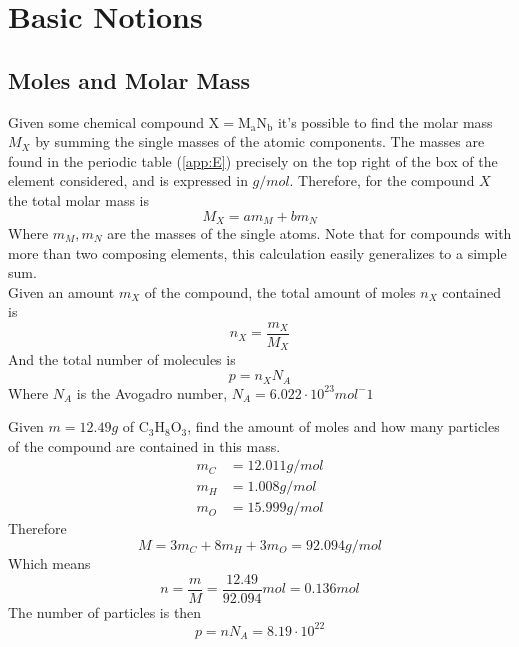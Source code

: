 \documentclass[../qm.tex]{subfiles}
\begin{document}
\section{Basic Notions}
\subsection{Moles and Molar Mass}
Given some chemical compound $\mathrm{X}=\mathrm{M_aN_b}$ it's possible to find the molar mass $M_X$ by summing the single masses of the atomic components. The masses are found in the periodic table (\ref{app:E}) precisely on the top right of the box of the element considered, and is expressed in $\unit{g/mol}$. Therefore, for the compound $X$ the total molar mass is
\begin{equation}
	M_X=am_M+bm_N
	\label{eq:molarmass}
\end{equation}
Where $m_M,m_N$ are the masses of the single atoms. Note that for compounds with more than two composing elements, this calculation easily generalizes to a simple sum.\\
Given an amount $m_X$ of the compound, the total amount of moles $n_X$ contained is
\begin{equation}
	n_X=\frac{m_X}{M_X}
	\label{eq:molescompound}
\end{equation}
And the total number of molecules is
\begin{equation}
	p=n_XN_A
	\label{eq:totalnummol}
\end{equation}
Where $N_A$ is the Avogadro number, $N_A=6.022\cdot10^{23}\unit{mol^-1}$
\begin{eg}
	Given $m=12.49\unit{g}$ of $\mathrm{C_3H_8O_3}$, find the amount of moles and how many particles of the compound are contained in this mass.
	\begin{equation*}
		\begin{aligned}
			m_C&=12.011\unit{g/mol}\\
			m_H&=1.008\unit{g/mol}\\
			m_O&=15.999\unit{g/mol}
		\end{aligned}
	\end{equation*}
	Therefore
	\begin{equation*}
		M=3m_C+8m_H+3m_O=92.094\unit{g/mol}
	\end{equation*}
	Which means
	\begin{equation*}
		n=\frac{m}{M}=\frac{12.49}{92.094}\unit{mol}=0.136\unit{mol}
	\end{equation*}
	The number of particles is then
	\begin{equation*}
		p=nN_A=8.19\cdot10^{22}
	\end{equation*}
\end{eg}
\end{document}
